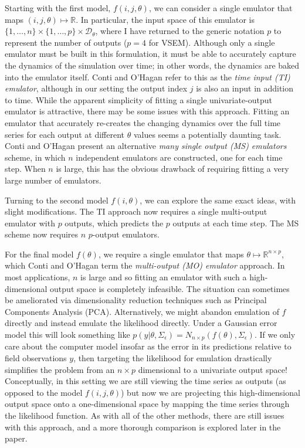 \documentclass[12pt]{article}
\newcommand{\R}{\mathbb{R}}
\begin{document}
Starting with the first model, $f(i, j, \theta)$, we can consider a single emulator that maps $(i, j, \theta) \mapsto \R$. In particular, the input space of this 
emulator is $\{1, \dots, n\} \times \{1, \dots, p\} \times \mathcal{D}_{\theta}$, where I have returned to the generic notation $p$ to represent the number 
of outputs ($p = 4$ for VSEM). Although only a single emulator must be built in this formulation, it must be able to accurately capture the dynamics of the
simulation over time; in other words, the dynamics are baked into the emulator itself. Conti and O'Hagan \cite{Conti} refer to this as the 
\textit{time input (TI) emulator}, although in our setting the output index $j$ is also an input in addition to time. While the apparent simplicity of fitting a 
single univariate-output emulator is attractive, there may be some issues with this approach. Fitting an emulator that accurately re-creates the changing dynamics
over the full time series for each output at different $\theta$ values seems a potentially daunting task. Conti and O'Hagan present an alternative 
\textit{many single output (MS) emulators} scheme, in which $n$ independent emulators are constructed, one for each time step. When $n$ is large, this has the 
obvious drawback of requiring fitting a very large number of emulators. 

Turning to the second model $f(i, \theta)$, we can explore the same exact ideas, with slight modifications. The TI approach now requires a single multi-output 
emulator with $p$ outputs, which predicts the $p$ outputs at each time step. The MS scheme now requires $n$ $p$-output emulators. 

For the final model $f(\theta)$, we require a single emulator that maps $\theta \mapsto \R^{n \times p}$, which Conti and O'Hagan term the 
\textit{multi-output (MO) emulator} approach. In most applications, $n$ is large and so fitting an emulator 
with such a high-dimensional output space is completely infeasible. The situation can sometimes be ameliorated via dimensionality reduction techniques such as 
Principal Components Analysis (PCA). Alternatively, we might abandon emulation of $f$ directly and instead emulate the likelihood directly. Under a Gaussian error
model this will look something like $p(y|\theta, \Sigma_\epsilon) = N_{n \times p}(f(\theta), \Sigma_\epsilon)$. If we only care about the computer model insofar as 
the error in its predictions relative to field observations $y$, then targeting the likelihood for emulation drastically simplifies the problem from an $n \times p$ 
dimensional to a univariate output space! Conceptually, in this setting we are still viewing the time series as outputs (as opposed to the model $f(i, j, \theta)$) but now 
we are projecting this high-dimensional output space onto a one-dimensional space by mapping the time series through the likelihood function. As with all of the other
methods, there are still issues with this approach, and a more thorough comparison is explored later in the paper. 
\end{document}
